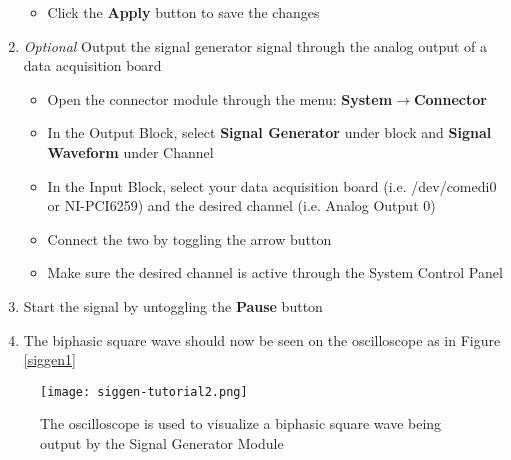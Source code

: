 \begin{enumerate}
\begin{itemize}
  \item Click the \textbf{Apply} button to save the changes
  \end{itemize}
\item \textit{Optional} Output the signal generator signal through the analog output of a data acquisition board
  \begin{itemize}
  \item Open the connector module through the menu: \textbf{System}$\rightarrow$\textbf{Connector}
  \item In the Output Block, select \textbf{Signal Generator} under block and \textbf{Signal Waveform} under Channel
  \item In the Input Block, select your data acquisition board (i.e. /dev/comedi0 or NI-PCI6259) and the desired channel (i.e. Analog Output 0)
  \item Connect the two by toggling the arrow button
  \item Make sure the desired channel is active through the System Control Panel
  \end{itemize}
\item Start the signal by untoggling the \textbf{Pause} button
\item The biphasic square wave should now be seen on the oscilloscope as in Figure \ref{siggen1}
\end{enumerate}

\begin{figure}[h]
\begin{center}
\texttt{[image: siggen-tutorial2.png]} 
\caption[Signal Generator Output]{The oscilloscope is used to visualize a biphasic square wave being output by the Signal Generator Module} 
\end{center}
\label{siggen2}
\end{figure}